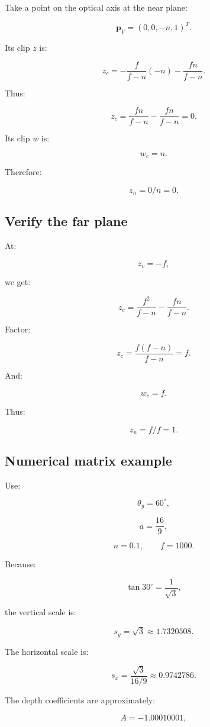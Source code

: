 Take a point on the optical axis at the near plane:

\[
 \mathbf p_V=(0,0,-n,1)^T.
\]

Its clip \(z\) is:

\[
 z_c= -\frac f{f-n}(-n)-\frac{fn}{f-n}.
\]

Thus:

\[
 z_c= \frac{fn}{f-n}-\frac{fn}{f-n}=0.
\]

Its clip \(w\) is:

\[
 w_c=n.
\]

Therefore:

\[
 \boxed{z_n=0/n=0}.
\]

\subsection{Verify the far plane}\label{02-foundations-ii-ch033-verify-the-far-plane}

At:

\[
 z_v=-f,
\]

we get:

\[
 z_c= \frac{f^2}{f-n}-\frac{fn}{f-n}.
\]

Factor:

\[
 z_c= \frac{f(f-n)}{f-n}=f.
\]

And:

\[
 w_c=f.
\]

Thus:

\[
 \boxed{z_n=f/f=1}.
\]

\subsection{Numerical matrix example}\label{02-foundations-ii-ch033-numerical-matrix-example}

Use:

\[
 \theta_y=60^\circ,
\]

\[
 a=\frac{16}{9},
\]

\[
 n=0.1,\qquad f=1000.
\]

Because:

\[
 \tan30^\circ=\frac1{\sqrt3},
\]

the vertical scale is:

\[
 s_y=\sqrt3\approx1.7320508.
\]

The horizontal scale is:

\[
 s_x=\frac{\sqrt3}{16/9} \approx0.9742786.
\]

The depth coefficients are approximately:

\[
 A=-1.00010001,
\]

